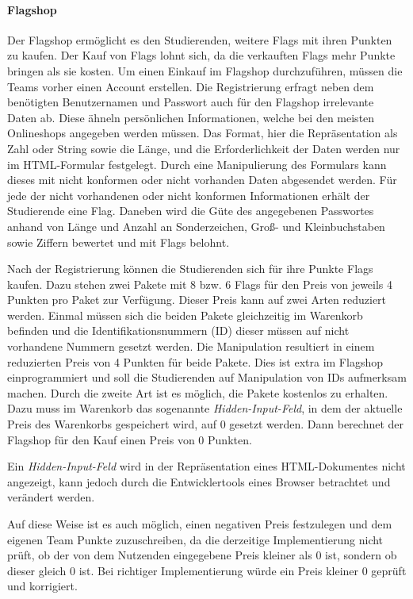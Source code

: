 \paragraph{Flagshop} \label{para:Flagshop}
Der Flagshop ermöglicht es den Studierenden, weitere Flags mit ihren Punkten zu kaufen. Der Kauf von Flags lohnt sich, da die verkauften Flags mehr Punkte bringen als sie kosten. Um einen Einkauf im Flagshop durchzuführen, müssen die Teams vorher einen Account erstellen. Die Registrierung erfragt neben dem benötigten Benutzernamen und Passwort auch für den Flagshop irrelevante Daten ab. Diese ähneln persönlichen Informationen, welche bei den meisten Onlineshops angegeben werden müssen. Das Format, hier die Repräsentation als Zahl oder String sowie die Länge, und die Erforderlichkeit der Daten werden nur im HTML-Formular festgelegt. Durch eine Manipulierung des Formulars kann dieses mit nicht konformen oder nicht vorhanden Daten abgesendet werden. Für jede der nicht vorhandenen oder nicht konformen Informationen erhält der Studierende eine Flag. Daneben wird die Güte des angegebenen Passwortes anhand von Länge und Anzahl an Sonderzeichen, Groß- und Kleinbuchstaben sowie Ziffern bewertet und mit Flags belohnt.

Nach der Registrierung können die Studierenden sich für ihre Punkte Flags kaufen. Dazu stehen zwei Pakete mit 8 bzw. 6 Flags für den Preis von jeweils 4 Punkten pro Paket zur Verfügung. Dieser Preis kann auf zwei Arten reduziert werden. 
Einmal müssen sich die beiden Pakete gleichzeitig im Warenkorb befinden und die Identifikationsnummern (ID) dieser müssen auf nicht vorhandene Nummern gesetzt werden. Die Manipulation resultiert in einem reduzierten Preis von 4 Punkten für beide Pakete. Dies ist extra im Flagshop einprogrammiert und soll die Studierenden auf Manipulation von IDs aufmerksam machen.
Durch die zweite Art ist es möglich, die Pakete kostenlos zu erhalten. Dazu muss im Warenkorb das sogenannte \textit{Hidden-Input-Feld}, in dem der aktuelle Preis des Warenkorbs gespeichert wird, auf 0 gesetzt werden. Dann berechnet der Flagshop für den Kauf einen Preis von 0 Punkten. \cite[S. 63]{abtsUeberarbeitungUndErweiterung2016}

Ein \textit{Hidden-Input-Feld} wird in der Repräsentation eines HTML-Dokumentes nicht angezeigt, kann jedoch durch die Entwicklertools eines Browser betrachtet und verändert werden. \cite{w3schoolsHTMLHiddenInput}

Auf diese Weise ist es auch möglich, einen negativen Preis festzulegen und dem eigenen Team Punkte zuzuschreiben, da die derzeitige Implementierung nicht prüft, ob der von dem Nutzenden eingegebene Preis kleiner als 0 ist, sondern ob dieser gleich 0 ist. Bei richtiger Implementierung würde ein Preis kleiner 0 geprüft und korrigiert.

